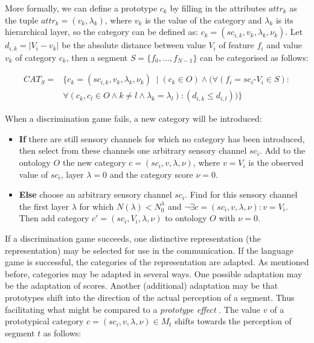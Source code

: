 \p
{}
More formally, we can define a prototype $c_k$ by filling in the attributes $attr_k$ as the tuple $attr_k = (v_k, \lambda_k)$, where $v_k$ is the value of the category and $\lambda_k$ is its hierarchical layer, so the category can be defined as: $c_k = (sc_{i,k}, v_k, \lambda_k, \nu_k)$. Let $d_{i,k}=|V_i-v_k|$ be the absolute distance between value $V_i$ of feature $f_i$ and value $v_k$ of category $c_k$, then a segment $S=\{f_0,\ldots,f_{N-1}\}$ can be categorised as follows:

\begin{eqnarray}
CAT_S=&\{c_k=(sc_{i,k},v_k,\lambda_k,\nu_k)\; \mid (c_k \in O) \wedge (\forall (f_i=sc_i\mbox{-}V_i \in S):\\ \nonumber
& \forall (c_k,c_l \in O \wedge k \neq l \wedge \lambda_k = \lambda_l): (d_{i,k} \leq d_{i,l}))\}
\label{e:cm:proto}
\end{eqnarray}


When a discrimination game fails, a new category will be introduced:

\begin{itemize}
\item {\bf If} there are still sensory channels for which no category has been introduced, then select from these channels one arbitrary sensory channel $sc_i$. Add to the ontology $O$ the new category $c=(sc_i,v,\lambda,\nu)$, where $v=V_i$ is the observed value of $sc_i$, layer $\lambda=0$ and the category score $\nu=0$.
\item {\bf Else} choose an arbitrary sensory channel $sc_i$. Find for this sensory channel the first layer $\lambda$ for which $N(\lambda) < N_0^\lambda$ and $\neg \exists c = (sc_i,v,\lambda,\nu): v=V_i$. Then add category $c'=(sc_i,V_i,\lambda,\nu)$ to ontology $O$ with $\nu=0$.
\end{itemize}

If a discrimination game succeeds, one distinctive representation (the representation) may be selected for use in the communication. If the language game is successful, the categories of the representation are adapted. As mentioned before, categories may be adapted in several ways. One possible adaptation may be the adaptation of scores. Another (additional) adaptation may be that prototypes shift into the direction of the actual perception of a segment. Thus facilitating what might be compared to a {\em prototype effect} \cite{rosch:1978}. The value $v$ of a prototypical category $c=(sc_i,v,\lambda,\nu) \in M_t$ shifts towards the perception of segment $t$ as follows:

